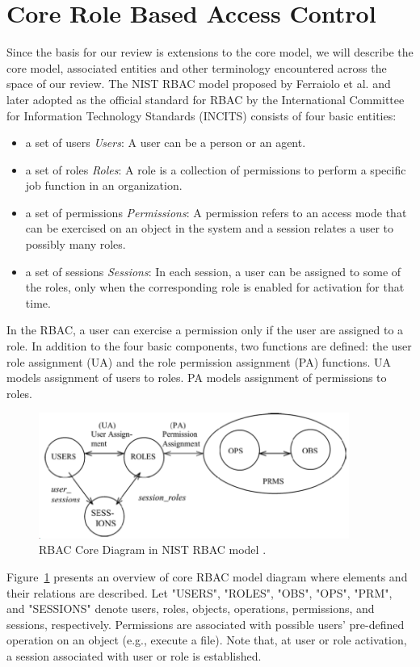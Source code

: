 
\section{Core Role Based Access Control} \label{sec:core-rbac}

Since the basis for our review is extensions to the core model, we will describe the core model, associated entities and other terminology encountered across the space of our review.  The NIST RBAC model proposed by Ferraiolo et al. and later adopted as the official standard for RBAC by the International Committee for Information Technology Standards (INCITS) consists of four basic entities:

\begin{itemize}
\item a set of users \emph{Users}: A user can be a person or an agent.
\item  a set of roles \emph{Roles}: A role is a collection of permissions to perform a specific job function in an organization.
\item a set of permissions \emph{Permissions}: A permission refers to an access mode that can be exercised on an object in the system and a session relates a user to possibly many roles.
\item a set of sessions \emph{Sessions}: In each session, a user can be assigned to some of the roles, only when the corresponding role is enabled for activation for that time.		
\end{itemize}

In the RBAC, a user can exercise a permission only if the user are assigned to a role.
In addition to the four basic components, two functions are defined:
the user role assignment (UA) and the role
permission assignment (PA) functions.
UA models assignment of users to roles.
PA models assignment of permissions to roles.

\begin{figure}[ht]
    \centering
        \includegraphics[width=4.0in]{sections/core-model.png}
    \caption{\label{fig:overview}RBAC Core Diagram in NIST RBAC model \cite{ferraiolokuhn}.}
\end{figure}


Figure~\ref{fig:overview} presents an overview of core RBAC model diagram where elements and their relations are described.
Let "USERS", "ROLES", "OBS", "OPS", "PRM", and "SESSIONS" denote users, roles, objects, operations, permissions, and sessions, respectively.
Permissions are associated with possible users' pre-defined operation on an object (e.g., execute a file).
Note that, at user or role activation, a session associated with user or role is established.
